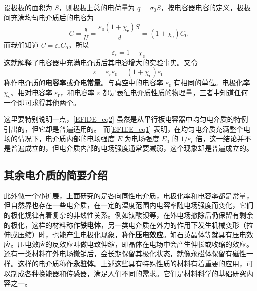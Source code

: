 设极板的面积为 $S$，则极板上总的电荷量为 $q=\sigma_{0} S$，按电容器电容的定义，极板间充满均匀电介质后的电容为
\begin{equation}
C=\frac{q}{U}=\frac{\varepsilon_{0}\left(1+\chi_{\mathrm e}\right) S}{d}=\left(1+\chi_{\mathrm e}\right) C_{0}
\end{equation}
而我们知道 $C=\varepsilon_\mathrm{r}C_0$，所以
\begin{equation} \label{EFIDE_eq2}
\varepsilon_{\mathrm{r}}=1+\chi_{\mathrm{e}}
\end{equation}
这就解释了电容器中充满电介质后其电容增大的实验事实。又令
\begin{equation}
\varepsilon=\varepsilon_{r} \varepsilon_{0}=\left(1+\chi_{\mathrm{e}}\right) \varepsilon_{0}
\end{equation}
称作电介质的\textbf{电容率}或\textbf{介电常量}。与真空中的电容率 $\varepsilon_0$ 有相同的单位。电极化率 $\chi_{\mathrm{e}}$、相对电容率 $\varepsilon_\mathrm{r}$，和电容率 $\varepsilon$ 都是表征电介质性质的物理量，三者中知道任何一个即可求得其他两个。

这里要特别说明一点，\autoref{EFIDE_eq2} 虽然是从平行板电容器中均匀电介质的特例引出的，但它却是普遍适用的。
而\autoref{EFIDE_eq1} 表明，在均匀电介质充满整个电场的情况下，电介质内部的电场强度 $E $ 为电场强度 $E_0$ 的 $1/\varepsilon_{\mathrm{r}}$ 倍，这一结论并不是普遍成立的，但电介质内部的电场强度通常要减弱，这个现象却是普遍成立的。

\subsection{其余电介质的简要介绍}
此外做一个小扩展，上面研究的是各向同性电介质，电极化率和电容率都是常量，但自然界也存在一些电介质，在一定的温度范围内电容率随电场强度而变化，它们的极化规律有着复杂的非线性关系。例如钛酸钡等，在外电场撤除后仍保留有剩余的极化，这样的材料称作\textbf{铁电体}，另一类电介质在外力的作用下发生机械变形（拉伸或压缩）时，也能产生电极化现象，称作\textbf{压电效应}。如石英晶体等就具有压电效应。压电效应的反效应叫做电致伸缩，即晶体在电场中会产生伸长或收缩的效应。还有一类材料在外电场撤销后，会长期保留其极化状态，就像永磁体保留有磁性一样。这样的电介质称作\textbf{永驻体}。上述这些具有特殊性质的材料有着重要的应用，可以制成各种换能器和传感器，满足人们不同的需求。它们是材料科学的基础研究内容之一。
